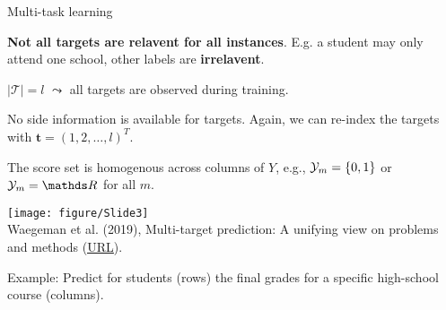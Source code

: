 \documentclass[11pt,compress,t,notes=noshow, xcolor=table]{beamer}
\newcommand{\Tspace}{\mathcal{T}}
\newcommand{\tv}{\mathbf{t}}
\begin{document}
\begin{frame}{Multi-task learning}

		\begin{itemize}\small
			
			\begin{minipage}{0.45\textwidth}  

                \item \textbf{Not all targets are relavent for all instances}. E.g. a student may only attend one school, other labels are \textbf{irrelavent}.
                \vspace{10pt}
                
                \item $|\Tspace|= l$ $\leadsto$ all targets are observed during training.
                \vspace{10pt}

			    \item No side information is available for targets. Again, we can re-index the targets with $\tv = (1, 2, \ldots, l)^T$. 
                \vspace{10pt}
       
				\item The score set is homogenous across columns of $Y$, e.g., $\mathcal{Y}_m = \{0,1\}$ or $\Yspace_m = \R$ for all $m$.
                \vspace{10pt}

			\end{minipage}
            \hfill
			\begin{minipage}{0.45\textwidth}    
				\begin{center} 	
					\texttt{[image: figure/Slide3]} \tiny
					\\ Waegeman et al. (2019), Multi-target prediction:
					A unifying view on problems and methods (\href{https://arxiv.org/pdf/1809.02352.pdf}{\underline{URL}}).	
				\end{center}
			\end{minipage}
		\end{itemize}
    \vspace{10pt}
	Example: Predict for students (rows) the final grades for a specific high-school course (columns).


\end{frame}
\end{document}
